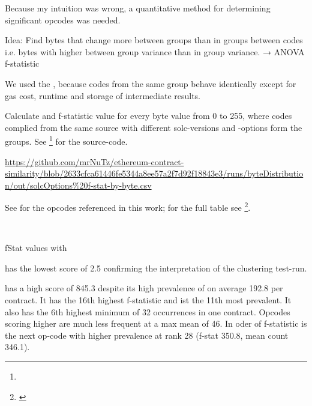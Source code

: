 \documentclass[../main.tex]{subfiles}
\begin{document}
Because my intuition was wrong, a quantitative method for determining significant opcodes was needed.

Idea: Find bytes that change more between groups than in groups between codes i.e. bytes with higher between group variance than in group variance. → ANOVA f-statistic

We used the , because codes from the same group behave identically except for gas cost, runtime and storage of intermediate results.


Calculate and f-statistic value for every byte value from 0 to 255, where codes complied from the same source with different solc-versions and -options form the groups. See \footnote{} for the source-code.

\urldef\urlFstat\url{https://github.com/mrNuTz/ethereum-contract-similarity/blob/2633cfca61446fe5344a8ee57a2f7d92f18843e3/runs/byteDistribution/out/solcOptions%20f-stat-by-byte.csv}

See  for the opcodes referenced in this work; for the full table see \footnote{\bfseries\scriptsize\urlFstat}.

\begin{table}[ht!]
  \centering
  \scriptsize %
  \parbox{5em}{~}
  \caption{fStat values with \n{\solcts}}
  \label{tbl:solcFstat}
\end{table}

 has the lowest score of 2.5 confirming the interpretation of the clustering test-run.

 has a high score of 845.3 despite its high prevalence of on average 192.8 per contract. It has the 16th highest f-statistic and ist the 11th most prevalent. It also has the 6th highest minimum of 32 occurrences in one contract. Opcodes scoring higher are much less frequent at a max mean of 46. In oder of f-statistic  is the next op-code with higher prevalence at rank 28 (f-stat 350.8, mean count 346.1).
\end{document}
